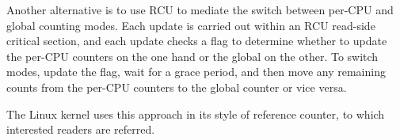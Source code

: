 Another alternative is to use RCU to mediate the switch between per-CPU
and global counting modes.
Each update is carried out within an RCU read-side critical section,
and each update checks a flag to determine whether to update the
per-CPU counters on the one hand or the global on the other.
To switch modes, update the flag, wait for a grace period, and then
move any remaining counts from the per-CPU counters to the global
counter or vice versa.

The Linux kernel uses this approach in its  style of
reference counter, to which interested readers are referred.

